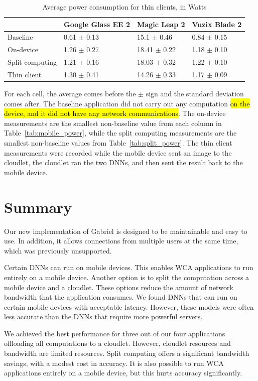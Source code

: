 \begin{table}
\begin{tabular}{|l||l|l|l|}
  \hline
  & Google Glass EE 2 & Magic Leap 2 & Vuzix Blade 2\\
  \hline
  \hline
  Baseline & 0.61 $\pm$ 0.13 & 15.1 $\pm$ 0.46 & 0.84 $\pm$ 0.15\\
  On-device & 1.26 $\pm$ 0.27 & 18.41 $\pm$ 0.22 & 1.18 $\pm$ 0.10\\
  Split computing & 1.21 $\pm$ 0.16 & 18.03 $\pm$ 0.32 & 1.22 $\pm$ 0.10\\
  Thin client & 1.30 $\pm$ 0.41 & 14.26 $\pm$ 0.33 & 1.17 $\pm$ 0.09\\
  \hline
\end{tabular}
\begin{captiontext}
    For each cell, the average comes before the $\pm$ sign and the standard
    deviation comes after.
    The baseline application did not carry out any computation \hl{on the
      device, and it did not have any network communications}.
    The on-device measurements are the smallest non-baseline value from
    each column in Table~\ref{tab:mobile_power}, while the split computing
    measurements are the smallest non-baseline values from
    Table~\ref{tab:split_power}.
    The thin client measurements were recorded while the mobile device sent an
    image to the cloudlet, the cloudlet ran the two DNNs, and then sent the
    result back to the mobile device.
\end{captiontext}
  \caption{
    Average power consumption for thin clients, in Watts
  }\label{tab:thin_power}
\end{table}

\section{Summary}

Our new implementation of Gabriel is designed to be maintainable and easy to
use.
In addition, it allows connections from multiple users at the same time, which
was previously unsupported.

Certain DNNs can run on mobile devices.
This enables WCA applications to run entirely on a mobile device.
Another option is to split the computation across a mobile device and a
cloudlet.
These options reduce the amount of network bandwidth that the application
consumes.
We found DNNs that can run on certain mobile devices with acceptable latency.
However, these models were often less accurate than the DNNs that require more
powerful servers.

We achieved the best performance for three out of our four applications
offloading all computations to a cloudlet.
However, cloudlet resources and bandwidth are limited resources.
Split computing offers a significant bandwidth savings, with a modest cost in
accuracy.
It is also possible to run WCA applications entirely on a mobile device, but
this hurts accuracy significantly.
